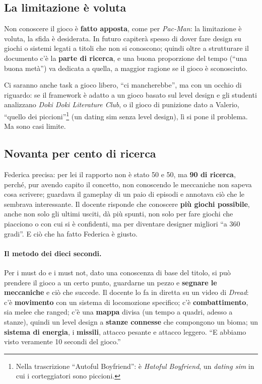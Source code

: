 \subsection{La limitazione è voluta}

Non conoscere il gioco è \textbf{fatto apposta}, come per \emph{Pac-Man}: la
limitazione è voluta, la sfida è desiderata. In futuro capiterà spesso di
dover fare design su giochi o sistemi legati a titoli che non si conoscono;
quindi oltre a strutturare il documento c'è la \textbf{parte di ricerca}, e
una buona proporzione del tempo (``una buona metà'') va dedicata a quella, a
maggior ragione se il gioco è sconosciuto.

Ci saranno anche task a gioco libero, ``ci mancherebbe'', ma con un occhio
di riguardo: se il framework è adatto a un gioco basato sul level design e
gli studenti analizzano \emph{Doki Doki Literature Club}, o il gioco di
punizione dato a Valerio, ``quello dei piccioni''\footnote{Nella trascrizione
``Autoful Boyfriend'': è \emph{Hatoful Boyfriend}, un \emph{dating sim} in
cui i corteggiatori sono piccioni.} (un dating sim senza level design), lì
si pone il problema. Ma sono casi limite.

\subsection{Novanta per cento di ricerca}

Federica precisa: per lei il rapporto non è stato 50 e 50, ma \textbf{90 di
ricerca}, perché, pur avendo capito il concetto, non conoscendo le meccaniche
non sapeva cosa scrivere; guardava il gameplay di un paio di episodi e
annotava ciò che le sembrava interessante. Il docente risponde che conoscere
\textbf{più giochi possibile}, anche non solo gli ultimi usciti, dà più
spunti, non solo per fare giochi che piacciono o con cui si è confidenti,
ma per diventare designer migliori ``a 360 gradi''. E ciò che ha fatto
Federica è giusto.

\paragraph{Il metodo dei dieci secondi.} Per i must do e i must not, dato
una conoscenza di base del titolo, si può prendere il gioco a un certo
punto, guardarne un pezzo e \textbf{segnare le meccaniche} e ciò che succede.
Il docente lo fa in diretta su un video di \emph{Dread}: c'è
\textbf{movimento} con un sistema di locomozione specifico; c'è
\textbf{combattimento}, sia melee che ranged; c'è una \textbf{mappa} divisa
(un tempo a quadri, adesso a stanze), quindi un level design a
\textbf{stanze connesse} che compongono un bioma; un \textbf{sistema di
energia}, i \textbf{missili}, attacco pesante e attacco leggero. ``E abbiamo
visto veramente 10 secondi del gioco.''

